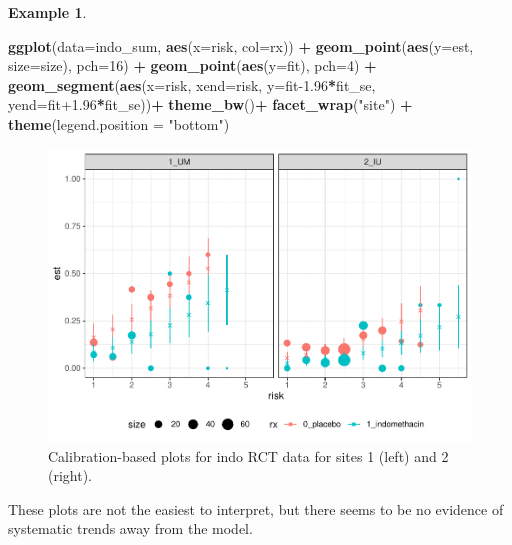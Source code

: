\documentclass[
  openany]{book}
\newenvironment{Shaded}{\begin{snugshade}}{\end{snugshade}}
\newcommand{\AttributeTok}[1]{\textcolor[rgb]{0.13,0.29,0.53}{#1}}
\newcommand{\DecValTok}[1]{\textcolor[rgb]{0.00,0.00,0.81}{#1}}
\newcommand{\FloatTok}[1]{\textcolor[rgb]{0.00,0.00,0.81}{#1}}
\newcommand{\FunctionTok}[1]{\textcolor[rgb]{0.13,0.29,0.53}{\textbf{#1}}}
\newcommand{\NormalTok}[1]{#1}
\newcommand{\SpecialCharTok}[1]{\textcolor[rgb]{0.81,0.36,0.00}{\textbf{#1}}}
\newcommand{\StringTok}[1]{\textcolor[rgb]{0.31,0.60,0.02}{#1}}
\theoremstyle{definition}
\theoremstyle{definition}
\newtheorem{example}{Example}[chapter]
\theoremstyle{definition}
\theoremstyle{definition}
\theoremstyle{remark}
\begin{document}
\begin{example}
\begin{Shaded}
\begin{Highlighting}[]
\FunctionTok{ggplot}\NormalTok{(}\AttributeTok{data=}\NormalTok{indo\_sum, }\FunctionTok{aes}\NormalTok{(}\AttributeTok{x=}\NormalTok{risk, }\AttributeTok{col=}\NormalTok{rx)) }\SpecialCharTok{+}
  \FunctionTok{geom\_point}\NormalTok{(}\FunctionTok{aes}\NormalTok{(}\AttributeTok{y=}\NormalTok{est, }\AttributeTok{size=}\NormalTok{size), }\AttributeTok{pch=}\DecValTok{16}\NormalTok{) }\SpecialCharTok{+} 
  \FunctionTok{geom\_point}\NormalTok{(}\FunctionTok{aes}\NormalTok{(}\AttributeTok{y=}\NormalTok{fit), }\AttributeTok{pch=}\DecValTok{4}\NormalTok{) }\SpecialCharTok{+}
  \FunctionTok{geom\_segment}\NormalTok{(}\FunctionTok{aes}\NormalTok{(}\AttributeTok{x=}\NormalTok{risk, }\AttributeTok{xend=}\NormalTok{risk, }\AttributeTok{y=}\NormalTok{fit}\FloatTok{{-}1.96}\SpecialCharTok{*}\NormalTok{fit\_se, }\AttributeTok{yend=}\NormalTok{fit}\FloatTok{+1.96}\SpecialCharTok{*}\NormalTok{fit\_se))}\SpecialCharTok{+}
  \FunctionTok{theme\_bw}\NormalTok{()}\SpecialCharTok{+}
  \FunctionTok{facet\_wrap}\NormalTok{(}\StringTok{"site"}\NormalTok{) }\SpecialCharTok{+} \FunctionTok{theme}\NormalTok{(}\AttributeTok{legend.position =} \StringTok{"bottom"}\NormalTok{)}
\end{Highlighting}
\end{Shaded}

\begin{figure}
\centering
\includegraphics{CT4H_notes_files/figure-latex/unnamed-chunk-46-1.pdf}
\caption{\label{fig:unnamed-chunk-46}Calibration-based plots for indo RCT data for sites 1 (left) and 2 (right).}
\end{figure}

These plots are not the easiest to interpret, but there seems to be no evidence of systematic trends away from the model.
\end{example}
\end{document}
